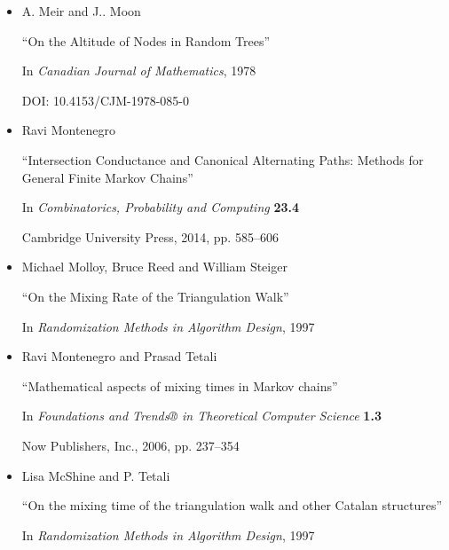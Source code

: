 \begin{itemize}
“Faster Mixing via Average Conductance”

In \emph{Proceedings of the Thirty-First Annual ACM Symposium on Theory of Computing}, STOC ’99

Atlanta, Georgia, USA: Association for Computing Machinery, 1999, pp. 282–287

DOI: 10.1145/301250.301317


      

\item[] [MM78]
A. Meir and J.. Moon

“On the Altitude of Nodes in Random Trees”

In \emph{Canadian Journal of Mathematics}, 1978

DOI: 10.4153/CJM-1978-085-0


      

\item[] [Mon14]
Ravi Montenegro

“Intersection Conductance and Canonical Alternating Paths: Methods for General Finite Markov Chains”

In \emph{Combinatorics, Probability and Computing} \textbf{23.4}

Cambridge University Press, 2014, pp. 585–606


      

\item[] [MRS97]
Michael Molloy, Bruce Reed and William Steiger

“On the Mixing Rate of the Triangulation Walk”

In \emph{Randomization Methods in Algorithm Design}, 1997


      

\item[] [MT06]
Ravi Montenegro and Prasad Tetali

“Mathematical aspects of mixing times in Markov chains”

In \emph{Foundations and Trends® in Theoretical Computer Science} \textbf{1.3}

Now Publishers, Inc., 2006, pp. 237–354


      

\item[] [MT97]
Lisa McShine and P. Tetali

“On the mixing time of the triangulation walk and other Catalan structures”

In \emph{Randomization Methods in Algorithm Design}, 1997


      


\end{itemize}
